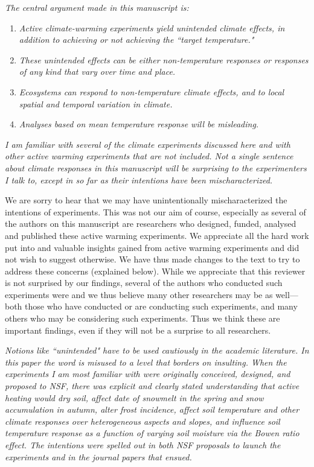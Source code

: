 \documentclass[11pt,a4paper]{letter}
\begin{document}
\emph{The central argument made in this manuscript is:}
\begin{enumerate}
\item \emph{Active climate-warming experiments yield unintended climate effects, in addition to achieving or not achieving the ``target temperature."}   
\item \emph{These unintended effects can be either non-temperature responses or responses of any kind that vary over time and place.}
\item \emph{Ecosystems can respond to non-temperature climate effects, and to local spatial and temporal variation in climate.}
\item \emph{Analyses based on mean temperature response will be misleading.}
\end{enumerate}

\emph{I am familiar with several of the climate experiments discussed here and with other active warming experiments that are not included.  Not a single sentence about climate responses in this manuscript will be surprising to the experimenters I talk to, except in so far as their intentions have been mischaracterized.}  

We are sorry to hear that we may have unintentionally mischaracterized the intentions of experiments. This was not our aim of course, especially as several of the authors on this manuscript are researchers who designed, funded, analysed and published these active warming experiments. We appreciate all the hard work put into and valuable insights gained from active warming experiments and did not wish to suggest otherwise. We have thus made changes to the text to try to address these concerns (explained below). While we appreciate that this reviewer is not surprised by our findings, several of the authors who conducted such experiments were and we thus believe many other researchers may be as well---both those who have conducted or are conducting such experiments, and many others who may be considering such experiments. Thus we think these are important findings, even if they will not be a surprise to all researchers.

\emph{Notions like ``unintended" have to be used cautiously in the academic literature.  In this paper the word is misused to a level that borders on insulting.  When the experiments I am most familiar with were originally conceived, designed, and proposed to NSF, there was explicit and clearly stated understanding that active heating would dry soil, affect date of snowmelt in the spring and snow accumulation in autumn, alter frost incidence, affect soil temperature and other climate responses over heterogeneous aspects and slopes, and influence soil temperature response as a function of varying soil moisture via the Bowen ratio effect.  The intentions were spelled out in both NSF proposals to launch the experiments and in the journal papers that ensued.}
\end{document}
